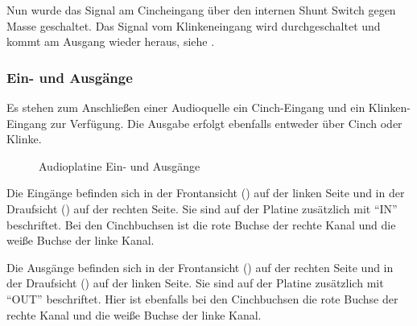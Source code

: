 
Nun wurde das Signal am Cincheingang über den internen Shunt Switch gegen Masse geschaltet. Das Signal vom Klinkeneingang wird durchgeschaltet und kommt am Ausgang wieder heraus, siehe .

\subsubsection{Ein- und Ausgänge}
Es stehen zum Anschließen einer Audioquelle ein Cinch-Eingang und ein Klinken-Eingang zur Verfügung. Die Ausgabe erfolgt ebenfalls entweder über Cinch oder Klinke.

\begin{figure}[htb]
    \centering
    \qquad
    \qquad
    \caption{Audioplatine Ein- und Ausgänge}
    \label{fig:audio-io}
\end{figure}

Die Eingänge befinden sich in der Frontansicht () auf der linken Seite und in der Draufsicht () auf der rechten Seite. Sie sind auf der Platine zusätzlich mit \enquote{IN} beschriftet. Bei den Cinchbuchsen ist die rote Buchse der rechte Kanal und die weiße Buchse der linke Kanal.

Die Ausgänge befinden sich in der Frontansicht () auf der rechten Seite und in der Draufsicht () auf der linken Seite. Sie sind auf der Platine zusätzlich mit \enquote{OUT} beschriftet. Hier ist ebenfalls bei den Cinchbuchsen die rote Buchse der rechte Kanal und die weiße Buchse der linke Kanal.

